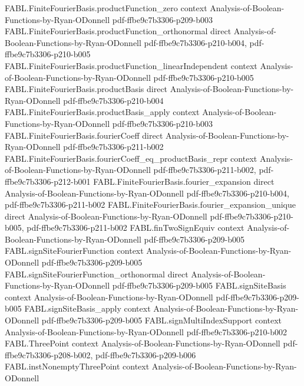 \begin{theorem}
\proofstep
  {FABL.FiniteFourierBasis.productFunction_zero}
  {context}
  {Analysis-of-Boolean-Functions-by-Ryan-ODonnell}
  {pdf-ffbe9c7b3306-p209-b003}
\proofstep
  {FABL.FiniteFourierBasis.productFunction_orthonormal}
  {direct}
  {Analysis-of-Boolean-Functions-by-Ryan-ODonnell}
  {pdf-ffbe9c7b3306-p210-b004,
    pdf-ffbe9c7b3306-p210-b005}
\proofstep
  {FABL.FiniteFourierBasis.productFunction_linearIndependent}
  {context}
  {Analysis-of-Boolean-Functions-by-Ryan-ODonnell}
  {pdf-ffbe9c7b3306-p210-b005}
\proofstep
  {FABL.FiniteFourierBasis.productBasis}
  {direct}
  {Analysis-of-Boolean-Functions-by-Ryan-ODonnell}
  {pdf-ffbe9c7b3306-p210-b004}
\proofstep
  {FABL.FiniteFourierBasis.productBasis_apply}
  {context}
  {Analysis-of-Boolean-Functions-by-Ryan-ODonnell}
  {pdf-ffbe9c7b3306-p210-b003}
\proofstep
  {FABL.FiniteFourierBasis.fourierCoeff}
  {direct}
  {Analysis-of-Boolean-Functions-by-Ryan-ODonnell}
  {pdf-ffbe9c7b3306-p211-b002}
\proofstep
  {FABL.FiniteFourierBasis.fourierCoeff_eq_productBasis_repr}
  {context}
  {Analysis-of-Boolean-Functions-by-Ryan-ODonnell}
  {pdf-ffbe9c7b3306-p211-b002,
    pdf-ffbe9c7b3306-p212-b001}
\proofstep
  {FABL.FiniteFourierBasis.fourier_expansion}
  {direct}
  {Analysis-of-Boolean-Functions-by-Ryan-ODonnell}
  {pdf-ffbe9c7b3306-p210-b004,
    pdf-ffbe9c7b3306-p211-b002}
\proofstep
  {FABL.FiniteFourierBasis.fourier_expansion_unique}
  {direct}
  {Analysis-of-Boolean-Functions-by-Ryan-ODonnell}
  {pdf-ffbe9c7b3306-p210-b005,
    pdf-ffbe9c7b3306-p211-b002}
\proofstep
  {FABL.finTwoSignEquiv}
  {context}
  {Analysis-of-Boolean-Functions-by-Ryan-ODonnell}
  {pdf-ffbe9c7b3306-p209-b005}
\proofstep
  {FABL.signSiteFourierFunction}
  {context}
  {Analysis-of-Boolean-Functions-by-Ryan-ODonnell}
  {pdf-ffbe9c7b3306-p209-b005}
\proofstep
  {FABL.signSiteFourierFunction_orthonormal}
  {direct}
  {Analysis-of-Boolean-Functions-by-Ryan-ODonnell}
  {pdf-ffbe9c7b3306-p209-b005}
\proofstep
  {FABL.signSiteBasis}
  {context}
  {Analysis-of-Boolean-Functions-by-Ryan-ODonnell}
  {pdf-ffbe9c7b3306-p209-b005}
\proofstep
  {FABL.signSiteBasis_apply}
  {context}
  {Analysis-of-Boolean-Functions-by-Ryan-ODonnell}
  {pdf-ffbe9c7b3306-p209-b005}
\proofstep
  {FABL.signMultiIndexSupport}
  {context}
  {Analysis-of-Boolean-Functions-by-Ryan-ODonnell}
  {pdf-ffbe9c7b3306-p210-b002}
\proofstep
  {FABL.ThreePoint}
  {context}
  {Analysis-of-Boolean-Functions-by-Ryan-ODonnell}
  {pdf-ffbe9c7b3306-p208-b002,
    pdf-ffbe9c7b3306-p209-b006}
\proofstep
  {FABL.instNonemptyThreePoint}
  {context}
  {Analysis-of-Boolean-Functions-by-Ryan-ODonnell}

\end{theorem}
